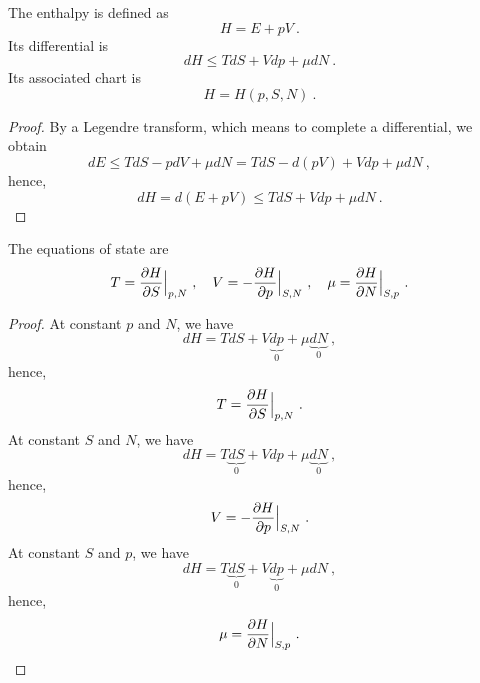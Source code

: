     The enthalpy is defined as 
    \begin{equation*}
        H = E + pV ~.
    \end{equation*}
    Its differential is 
    \begin{equation}\label{td:d:h}
        dH \leq TdS + Vdp + \mu dN ~.
    \end{equation}
    Its associated chart is
    \begin{equation*}
        H = H(p, S, N) ~.
    \end{equation*}
    \begin{proof}
        By a Legendre transform, which means to complete a differential, we obtain
        \begin{equation*}
            dE \leq T dS - p dV + \mu dN = TdS - d(pV) + V dp + \mu dN ~,
        \end{equation*}
        hence,
        \begin{equation*}
            dH = d(E + pV) \leq TdS + Vdp + \mu dN ~.
        \end{equation*}
    \end{proof}
    The equations of state are
    \begin{equation}\label{td:es:h}
        T = \frac{\partial H}{\partial S} \Big \vert_{p,N} ~, \quad V = - \frac{\partial H}{\partial p} \Big \vert_{S,N} ~, \quad \mu = \frac{\partial H}{\partial N} \Big \vert_{S, p} ~. 
    \end{equation}
    \begin{proof}
        At constant $p$ and $N$, we have
        \begin{equation*}
            dH = TdS + V\underbrace{dp}_0 + \mu \underbrace{dN}_0 ~,
        \end{equation*}
        hence,
        \begin{equation*}
            T = \frac{\partial H}{\partial S} \Big \vert_{p,N} ~.
        \end{equation*}
        At constant $S$ and $N$, we have
        \begin{equation*}
            dH = T\underbrace{dS}_0 + Vdp + \mu \underbrace{dN}_0~,
        \end{equation*}
        hence,
        \begin{equation*}
            V = - \frac{\partial H}{\partial p} \Big \vert_{S,N} ~.
        \end{equation*}
        At constant $S$ and $p$, we have
        \begin{equation*}
            dH = T\underbrace{dS}_0 + V\underbrace{dp}_0 + \mu dN ~,
        \end{equation*}
        hence,
        \begin{equation*}
            \mu = \frac{\partial H}{\partial N} \Big \vert_{S, p} ~.
        \end{equation*}
    \end{proof}
